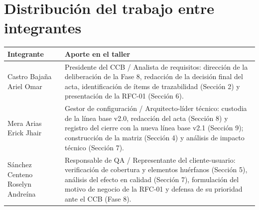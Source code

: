 \documentclass[11pt,a4paper]{article}
\begin{document}
\section{Distribución del trabajo entre integrantes}

\begin{longtable}{|p{5cm}|p{9cm}|}
\hline
\textbf{Integrante} & \textbf{Aporte en el taller} \\ \hline
\endhead
Castro Bajaña Ariel Omar & Presidente del CCB / Analista de requisitos: dirección de la deliberación de la Fase 8, redacción de la decisión final del acta, identificación de ítems de trazabilidad (Sección 2) y presentación de la RFC-01 (Sección 6). \\ \hline
Mera Arias Erick Jhair & Gestor de configuración / Arquitecto-líder técnico: custodia de la línea base v2.0, redacción del acta (Sección 8) y registro del cierre con la nueva línea base v2.1 (Sección 9); construcción de la matriz (Sección 4) y análisis de impacto técnico (Sección 7). \\ \hline
Sánchez Centeno Roselyn Andreína & Responsable de QA / Representante del cliente-usuario: verificación de cobertura y elementos huérfanos (Sección 5), análisis del efecto en calidad (Sección 7), formulación del motivo de negocio de la RFC-01 y defensa de su prioridad ante el CCB (Fase 8). \\ \hline
\end{longtable}
\end{document}
